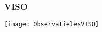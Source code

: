 \begin{landscape}
\subsubsection{VISO}%
\vspace*{-0.5cm}
\begin{center}
	\texttt{[image: ObservatielesVISO]}
\end{center}
	

\end{landscape}
